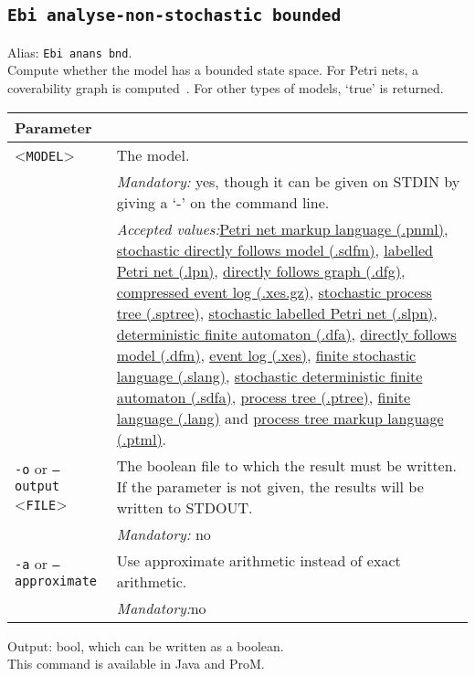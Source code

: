 {\subsection{\texttt{Ebi analyse-non-stochastic bounded}}
\label{command:Ebi analyse-non-stochastic bounded}
Alias: \texttt{Ebi anans bnd}.\\
Compute whether the model has a bounded state space. 
        For Petri nets, a coverability graph is computed~\cite{esparza2019petri}. 
        For other types of models, `true' is returned.\\
\begin{tabularx}{\linewidth}{lX}
\toprule
Parameter \\\midrule
<\texttt{MODEL}>&The model.\\
&\textit{Mandatory:} \quad yes, though it can be given on STDIN by giving a `-' on the command line.\\
&\textit{Accepted values:}\quad \hyperref[filehandler:Petri net markup language]{Petri net markup language (.pnml)}, \hyperref[filehandler:stochastic directly follows model]{stochastic directly follows model (.sdfm)}, \hyperref[filehandler:labelled Petri net]{labelled Petri net (.lpn)}, \hyperref[filehandler:directly follows graph]{directly follows graph (.dfg)}, \hyperref[filehandler:compressed event log]{compressed event log (.xes.gz)}, \hyperref[filehandler:stochastic process tree]{stochastic process tree (.sptree)}, \hyperref[filehandler:stochastic labelled Petri net]{stochastic labelled Petri net (.slpn)}, \hyperref[filehandler:deterministic finite automaton]{deterministic finite automaton (.dfa)}, \hyperref[filehandler:directly follows model]{directly follows model (.dfm)}, \hyperref[filehandler:event log]{event log (.xes)}, \hyperref[filehandler:finite stochastic language]{finite stochastic language (.slang)}, \hyperref[filehandler:stochastic deterministic finite automaton]{stochastic deterministic finite automaton (.sdfa)}, \hyperref[filehandler:process tree]{process tree (.ptree)}, \hyperref[filehandler:finite language]{finite language (.lang)} and \hyperref[filehandler:process tree markup language]{process tree markup language (.ptml)}.\\
\texttt{-o} or \texttt{--output} <\texttt{FILE}> &
The boolean file to which the result must be written. If the parameter is not given, the results will be written to STDOUT.\\
&\textit{Mandatory:} \quad no\\
\texttt{-a} or \texttt{--approximate} & Use approximate arithmetic instead of exact arithmetic.\\
&\textit{Mandatory:}\quad no\\
\bottomrule
\end{tabularx}
\noindent Output: bool, which can be written as a boolean.
\\This command is available in Java and ProM.
}
